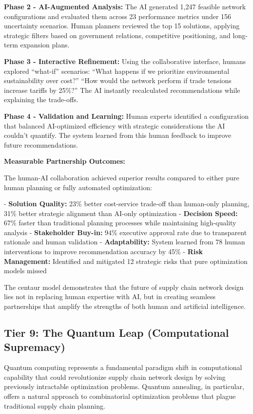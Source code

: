 \documentclass{article}
\begin{document}
\textbf{Phase 2 - AI-Augmented Analysis:} The AI generated 1,247 feasible network configurations and evaluated them across 23 performance metrics under 156 uncertainty scenarios. Human planners reviewed the top 15 solutions, applying strategic filters based on government relations, competitive positioning, and long-term expansion plans.

\textbf{Phase 3 - Interactive Refinement:} Using the collaborative interface, humans explored ``what-if'' scenarios: ``What happens if we prioritize environmental sustainability over cost?'' ``How would the network perform if trade tensions increase tariffs by 25\%?'' The AI instantly recalculated recommendations while explaining the trade-offs.

\textbf{Phase 4 - Validation and Learning:} Human experts identified a configuration that balanced AI-optimized efficiency with strategic considerations the AI couldn't quantify. The system learned from this human feedback to improve future recommendations.

\textbf{Measurable Partnership Outcomes:}

The human-AI collaboration achieved superior results compared to either pure human planning or fully automated optimization:

- \textbf{Solution Quality:} 23\% better cost-service trade-off than human-only planning, 31\% better strategic alignment than AI-only optimization
- \textbf{Decision Speed:} 67\% faster than traditional planning processes while maintaining high-quality analysis
- \textbf{Stakeholder Buy-in:} 94\% executive approval rate due to transparent rationale and human validation
- \textbf{Adaptability:} System learned from 78 human interventions to improve recommendation accuracy by 45\%
- \textbf{Risk Management:} Identified and mitigated 12 strategic risks that pure optimization models missed

The centaur model demonstrates that the future of supply chain network design lies not in replacing human expertise with AI, but in creating seamless partnerships that amplify the strengths of both human and artificial intelligence.

\subsection{Tier 9: The Quantum Leap (Computational Supremacy)}

Quantum computing represents a fundamental paradigm shift in computational capability that could revolutionize supply chain network design by solving previously intractable optimization problems. Quantum annealing, in particular, offers a natural approach to combinatorial optimization problems that plague traditional supply chain planning.
\end{document}
